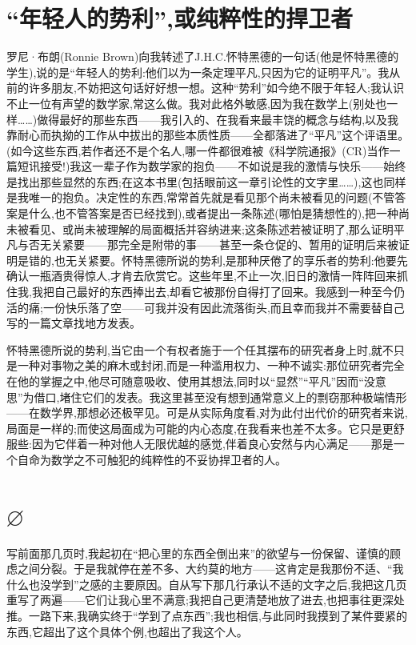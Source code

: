 \section{“年轻人的势利”,或纯粹性的捍卫者}

罗尼·布朗(Ronnie Brown)向我转述了J.H.C.怀特黑德的一句话(他是怀特黑德的学生),说的是“年轻人的势利:他们以为一条定理平凡,只因为它的证明平凡”。我从前的许多朋友,不妨把这句话好好想一想。这种“势利”如今绝不限于年轻人;我认识不止一位有声望的数学家,常这么做。我对此格外敏感,因为我在数学上(别处也一样……)做得最好的那些东西——我引入的、在我看来最丰饶的概念与结构,以及我靠耐心而执拗的工作从中拔出的那些本质性质——全都落进了“平凡”这个评语里。(如今这些东西,若作者还不是个名人,哪一件都很难被《科学院通报》(CR)当作一篇短讯接受!)我这一辈子作为数学家的抱负——不如说是我的激情与快乐——始终是找出那些显然的东西;在这本书里(包括眼前这一章引论性的文字里……),这也同样是我唯一的抱负。决定性的东西,常常首先就是看见那个尚未被看见的问题(不管答案是什么,也不管答案是否已经找到),或者提出一条陈述(哪怕是猜想性的),把一种尚未被看见、或尚未被理解的局面概括并容纳进来;这条陈述若被证明了,那么证明平凡与否无关紧要——那完全是附带的事——甚至一条仓促的、暂用的证明后来被证明是错的,也无关紧要。怀特黑德所说的势利,是那种厌倦了的享乐者的势利:他要先确认一瓶酒贵得惊人,才肯去欣赏它。这些年里,不止一次,旧日的激情一阵阵回来抓住我,我把自己最好的东西捧出去,却看它被那份自得打了回来。我感到一种至今仍活的痛;一份快乐落了空——可我并没有因此流落街头,而且幸而我并不需要替自己写的一篇文章找地方发表。

怀特黑德所说的势利,当它由一个有权者施于一个任其摆布的研究者身上时,就不只是一种对事物之美的麻木或封闭,而是一种滥用权力、一种不诚实:那位研究者完全在他的掌握之中,他尽可随意吸收、使用其想法,同时以“显然”“平凡”因而“没意思”为借口,堵住它们的发表。我这里甚至没有想到通常意义上的剽窃那种极端情形——在数学界,那想必还极罕见。可是从实际角度看,对为此付出代价的研究者来说,局面是一样的;而使这局面成为可能的内心态度,在我看来也差不太多。它只是更舒服些:因为它伴着一种对他人无限优越的感觉,伴着良心安然与内心满足——那是一个自命为数学之不可触犯的纯粹性的不妥协捍卫者的人。

\section{$\varnothing$}

写前面那几页时,我起初在“把心里的东西全倒出来”的欲望与一份保留、谨慎的顾虑之间分裂。于是我就停在差不多、大约莫的地方——这肯定是我那份不适、“我什么也没学到”之感的主要原因。自从写下那几行承认不适的文字之后,我把这几页重写了两遍——它们让我心里不满意;我把自己更清楚地放了进去,也把事往更深处推。一路下来,我确实终于“学到了点东西”;我也相信,与此同时我摸到了某件要紧的东西,它超出了这个具体个例,也超出了我这个人。

